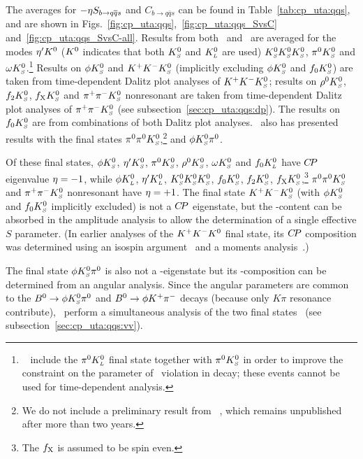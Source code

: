 The averages for $-\etacp S_{b \to q\bar q s}$ and $C_{b \to q\bar q s}$
can be found in Table~\ref{tab:cp_uta:qqs},
and are shown in Figs.~\ref{fig:cp_uta:qqs},~\ref{fig:cp_uta:qqs_SvsC} 
and~\ref{fig:cp_uta:qqs_SvsC-all}.
Results from both \babar\  and \belle\ are averaged for the modes
${\eta^{\prime}}K^0$ ($K^0$ indicates that both $K^0_{\scriptscriptstyle S}$ and $K^0_{\scriptscriptstyle L}$ are used)
$K^0_{\scriptscriptstyle S}K^0_{\scriptscriptstyle S}K^0_{\scriptscriptstyle S}$, $\pi^0 K^0_{\scriptscriptstyle S}$ and $\omega K^0_{\scriptscriptstyle S}$.\footnote{
  \belle~\cite{Fujikawa:2008pk} include the $\pi^0K^0_{\scriptscriptstyle L}$ final state together with $\pi^0 K^0_{\scriptscriptstyle S}$ in order to improve the constraint on the parameter of \CP\ violation in decay; these events cannot be used for time-dependent analysis.
}
Results on $\phi K^0_{\scriptscriptstyle S}$ and $K^+K^-K^0_{\scriptscriptstyle S}$ (implicitly excluding $\phi K^0_{\scriptscriptstyle S}$ and $f_0K^0_{\scriptscriptstyle S}$) are taken from time-dependent Dalitz plot analyses of $K^+K^-K^0_{\scriptscriptstyle S}$;
results on $\rho^0K^0_{\scriptscriptstyle S}$, $f_2K^0_{\scriptscriptstyle S}$, $f_{\rm X}K^0_{\scriptscriptstyle S}$ and $\pi^+\pi^-K^0_{\scriptscriptstyle S}$ nonresonant are taken from time-dependent Dalitz plot analyses of $\pi^+\pi^-K^0_{\scriptscriptstyle S}$ (see
subsection~\ref{sec:cp_uta:qqs:dp}).
The results on $f_0K^0_{\scriptscriptstyle S}$ are from combinations of both Dalitz plot analyses.
\babar\ also has presented results with the final states
$\pi^0\pi^0K^0_{\scriptscriptstyle S}$,\footnote{
  We do not include a preliminary result from \belle~\cite{:2007xd}, which
  remains unpublished after more than two years.
}
and $\phi K^0_{\scriptscriptstyle S} \pi^0$. 

Of these final states,
$\phi K^0_{\scriptscriptstyle S}$, ${\eta^{\prime}}K^0_{\scriptscriptstyle S}$, $\pi^0 K^0_{\scriptscriptstyle S}$, $\rho^0K^0_{\scriptscriptstyle S}$, $\omega K^0_{\scriptscriptstyle S}$ and $f_0K^0_{\scriptscriptstyle L}$
have $C\!P$ eigenvalue ${\eta} = -1$, 
while $\phi K^0_{\scriptscriptstyle L}$, ${\eta^{\prime}}K^0_{\scriptscriptstyle L}$, $K^0_{\scriptscriptstyle S}K^0_{\scriptscriptstyle S}K^0_{\scriptscriptstyle S}$, $f_0 K^0_{\scriptscriptstyle S}$, $f_2 K^0_{\scriptscriptstyle S}$, 
$f_{\rm X} K^0_{\scriptscriptstyle S}$,\footnote{ 
  The $f_{\rm X}$ is assumed to be spin even.
} $\pi^0\pi^0K^0_{\scriptscriptstyle S}$ and $\pi^+ \pi^- K^0_{\scriptscriptstyle S}$ nonresonant have ${\eta} = +1$.
The final state $K^+K^-K^0_{\scriptscriptstyle S}$ (with $\phi K^0_{\scriptscriptstyle S}$ and $f_0K^0_{\scriptscriptstyle S}$ implicitly excluded)
is not a $C\!P$ eigenstate, but the \CP-content can be absorbed in the amplitude analysis to allow the determination of a single effective $S$ parameter.
(In earlier analyses of the $K^+K^-K^0$ final state,
its $C\!P$ composition was determined using an isospin argument~\cite{Abe:2006gy}
and a moments analysis~\cite{Aubert:2005ja}.)



The final state $\phi K^0_{\scriptscriptstyle S} \pi^0$ is also not a \CP-eigenstate but its
\CP-composition can be determined from an angular analysis.
Since the angular parameters are common to the $B^0\to\phi K^0_{\scriptscriptstyle S} \pi^0$ and
$B^0\to \phi K^+\pi^-$ decays (because only $K\pi$ resonance contribute),
\babar\ perform a simultaneous analysis of the two final
states~\cite{Aubert:2008zza} (see subsection~\ref{sec:cp_uta:qqs:vv}).

